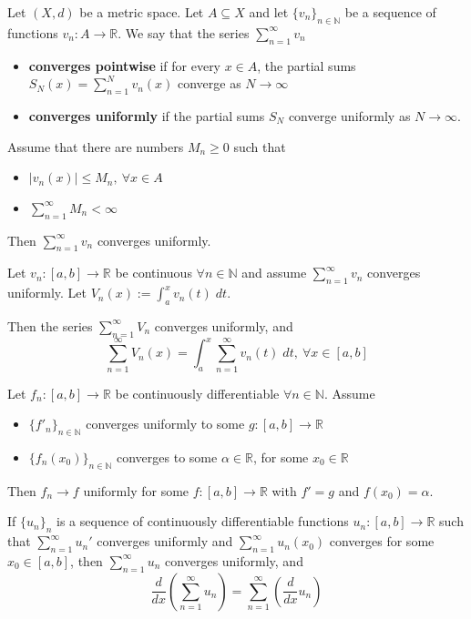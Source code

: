 \begin{defn}
    Let $(X,d)$ be a metric space. Let $A \subseteq X$ and let 
    $\{v_n\}_{n \in \mathbb N}$ be a sequence of functions 
    $v_n : A \to \mathbb R$. We say that the series 
    $\sum_{n=1}^\infty v_n$ 
    \begin{itemize}
        \item \textbf{converges pointwise} if for every 
            $x \in A$, the partial sums 
            $S_N(x) = \sum_{n=1}^{N}v_n(x)$ converge as $N 
            \to \infty$
        \item \textbf{converges uniformly} if the partial sums $S_N$ 
            converge uniformly as $N \to \infty$. 
    \end{itemize}
\end{defn}
\begin{lem}
    Assume that there are numbers $M_n \geq 0$ such that 
    \begin{itemize}
        \item $|v_n(x)| \leq M_n, \: \forall x \in A$
        \item $\sum_{n=1}^\infty M_n < \infty$
    \end{itemize}
    Then $\sum_{n=1}^{\infty}v_n$ converges uniformly.
\end{lem}
\begin{thm}
    Let $v_n : [a,b] \to \mathbb R$ be continuous $\forall n \in 
    \mathbb N$ and assume $\sum_{n=1}^{\infty}v_n$ converges 
    uniformly. Let $V_n(x) := \displaystyle\int_{a}^{x}v_n(t) \; dt$. 

    Then the series $\sum_{n=1}^{\infty}V_n$ converges uniformly, 
    and 
    \[
        \displaystyle\sum_{n=1}^\infty V_n(x) = 
        \displaystyle\int_{a}^{x}\displaystyle\sum_{n=1}^\infty 
        v_n(t) \; dt, \ \forall x \in [a,b]
    \]
\end{thm}
\begin{thm}
    Let $f_n : [a,b] \to \mathbb R$ be continuously differentiable 
    $\forall n \in \mathbb N$. Assume 
    \begin{itemize}
        \item $\{f'_n\}_{n\in\mathbb N}$ 
                converges uniformly to some $g : [a,b] 
            \to \mathbb R$ 
        \item $\{f_n(x_0)\}_{n\in\mathbb N}$ converges to some 
            $\alpha \in \mathbb R$, for some $x_0 \in \mathbb R$
    \end{itemize}
    Then $f_n \to f $ uniformly for some $f : [a,b] \to \mathbb R$
    with $f' = g$ and $f(x_0 ) = \alpha$.
\end{thm}
\begin{thm}
    If $\{u_n\}_n$ is a sequence of continuously differentiable 
    functions $u_n : [a,b] \to \mathbb R$ such that 
    $\sum_{n=1}^{\infty}u_n'$ converges uniformly and 
    $\sum_{n=1}^{\infty}u_n(x_0)$ converges for some $x_0 \in [a,b]$,
    then $\sum_{n=1}^{\infty}u_n$ converges uniformly, and 
    \[
        \frac{d}{dx} \left( \displaystyle\sum_{n=1}^{\infty}u_n  
        \right) = \displaystyle\sum_{n=1}^{\infty}\left( 
        \frac{d}{dx} u_n\right)
    \]
\end{thm}

